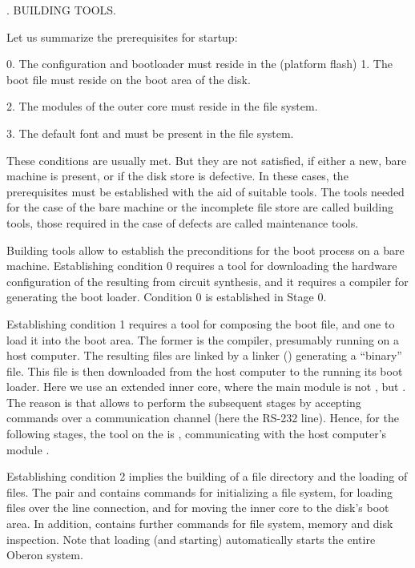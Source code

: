 . BUILDING TOOLS.

Let us summarize the prerequisites for startup:

\item{0.} The  configuration and bootloader must reside in the  (platform flash) 1. The boot file must reside on the boot area of the disk.
\item{2.} The modules of the outer core must reside in the file system.
\item{3.} The default font and  must be present in the file system.

These conditions are usually met. But they are not satisfied, if either a new, bare machine is present, or if the disk store is defective. In these cases, the prerequisites must be established with the aid of suitable tools. The tools needed for the case of the bare machine or the incomplete file store are called building tools, those required in the case of defects are called maintenance tools.

Building tools allow to establish the preconditions for the boot process on a bare machine. Establishing condition 0 requires a tool for downloading the hardware configuration of the  resulting from circuit synthesis, and it requires a compiler for generating the boot loader. Condition 0 is established in Stage 0.

Establishing condition 1 requires a tool for composing the boot file, and one to load it into the boot area. The former is the compiler, presumably running on a host computer. The resulting files are linked by a linker () generating a ``binary'' file. This file is then downloaded from the host computer to the  running its boot loader. Here we use an extended inner core, where the main module is not , but . The reason is that  allows to perform the subsequent stages by accepting commands over a communication channel (here the RS-232 line). Hence, for the following stages, the tool on the  is , communicating with the host computer's module .

Establishing condition 2 implies the building of a file directory and the loading of files. The pair  and  contains commands for initializing a file system, for loading files over the line connection, and for moving the inner core to the disk's boot area. In addition,  contains further commands for file system, memory and disk inspection. Note that loading (and starting)  automatically starts the entire Oberon system.

